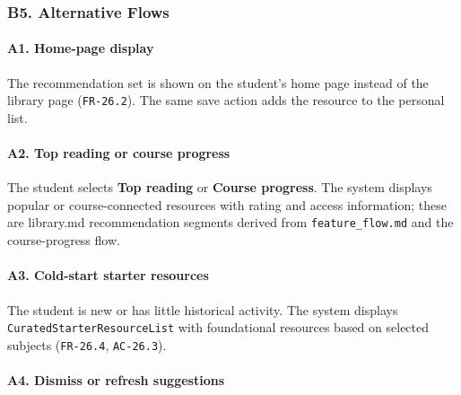 \documentclass[12pt]{article}
\begin{document}
\hypertarget{sec:b5-alternative-flows}{}
\subsubsection*{B5. Alternative Flows}
\par\medskip

\hypertarget{sec:a1-home-page-display}{}
\paragraph*{A1. Home-page display}
\par\medskip

The recommendation set is shown on the student's home page instead of the library page (\texttt{FR-26.2}). The same save action adds the resource to the personal list.
\par\medskip

\hypertarget{sec:a2-top-reading-or-course-progress}{}
\paragraph*{A2. Top reading or course progress}
\par\medskip

The student selects \textbf{Top reading} or \textbf{Course progress}. The system displays popular or course-connected resources with rating and access information; these are library.md recommendation segments derived from \texttt{feature\_flow.md} and the course-progress flow.
\par\medskip

\hypertarget{sec:a3-cold-start-starter-resources}{}
\paragraph*{A3. Cold-start starter resources}
\par\medskip

The student is new or has little historical activity. The system displays \texttt{CuratedStarterResourceList} with foundational resources based on selected subjects (\texttt{FR-26.4}, \texttt{AC-26.3}).
\par\medskip

\hypertarget{sec:a4-dismiss-or-refresh-suggestions}{}
\paragraph*{A4. Dismiss or refresh suggestions}
\par\medskip
\end{document}

